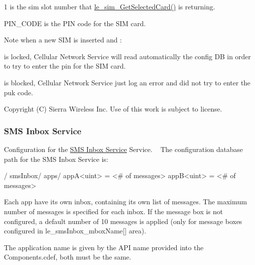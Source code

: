 \begin{DoxyItemize}
\item \textquotesingle{}1\textquotesingle{} is the sim slot number that \hyperlink{le__sim__interface_8h_a4c9e3ded0485f14c66e4d51763f2de57}{le\+\_\+sim\+\_\+\+Get\+Selected\+Card()} is returning.
\item \textquotesingle{}P\+I\+N\+\_\+\+C\+O\+D\+E\textquotesingle{} is the P\+I\+N code for the S\+I\+M card.
\end{DoxyItemize}

\begin{DoxyNote}{Note}
when a new S\+I\+M is inserted and \+:
\begin{DoxyItemize}
\item is locked, Cellular Network Service will read automatically the config D\+B in order to try to enter the pin for the S\+I\+M card.
\item is blocked, Cellular Network Service just log an error and did not try to enter the puk code.
\end{DoxyItemize}
\end{DoxyNote}
Copyright (C) Sierra Wireless Inc. Use of this work is subject to license. ~\newline
\hypertarget{config_tree_page_mbxConfigTree}{}\subsubsection{S\+M\+S Inbox Service}\label{config_tree_page_mbxConfigTree}
Configuration for the \hyperlink{c_smsInbox}{S\+M\+S Inbox Service} Service. ~\newline
 The configuration database path for the S\+M\+S Inbox Service is\+: \begin{DoxyVerb}/
    smsInbox/
        apps/
            appA<uint> = <# of messages>
            appB<uint> = <# of messages>
\end{DoxyVerb}


Each app have its own inbox, containing its own list of messages. The maximum number of messages is specified for each inbox. If the message box is not configured, a default number of 10 messages is applied (only for message boxes configured in le\+\_\+sms\+Inbox\+\_\+mbox\+Name\mbox{[}\mbox{]} area).

The application name is given by the A\+P\+I name provided into the Components.\+cdef, both must be the same.


